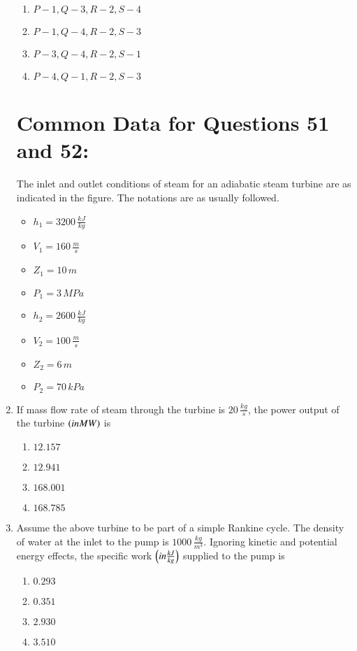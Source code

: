 \documentclass[journal,12pt,twocolumn]{IEEEtran}
\theoremstyle{remark}
\begin{document}
\begin{enumerate}[start=49]
    \begin{enumerate}
        \item $P - 1, Q - 3, R - 2, S - 4$
        \item $P - 1, Q - 4, R - 2, S - 3$
        \item $P - 3, Q - 4, R - 2, S - 1$
        \item $P - 4, Q - 1, R - 2, S - 3$
    \end{enumerate}
  

  \section{  Common Data for Questions 51 and 52:}
    
    The inlet and outlet conditions of steam for an adiabatic steam turbine are as indicated in the figure. The notations are as usually followed.
    
    \begin{itemize}
        \item $h_1 = 3200 \, \frac{kJ}{kg}$
        \item $V_1 = 160 \, \frac{m}{s}$
        \item $Z_1 = 10 \, m$
        \item $P_1 = 3 \, MPa$
        \item $h_2 = 2600 \, \frac{kJ}{kg}$
        \item $V_2 = 100 \, \frac{m}{s}$
        \item $Z_2 = 6 \, m$
        \item $P_2 = 70 \, kPa$
    \end{itemize}

    \item If mass flow rate of steam through the turbine is $20 \, \frac{kg}{s}$, the power output of the turbine $\left(in 
 MW\right)$ is
    \begin{enumerate}
        \item $12.157$
        \item $12.941$
        \item $168.001$
        \item $168.785$
    \end{enumerate}

    \item Assume the above turbine to be part of a simple Rankine cycle. The density of water at the inlet to the pump is $1000 \, \frac{kg}{m^3}$. Ignoring kinetic and potential energy effects, the specific work $\left(in \frac{kJ}{kg}\right)$ supplied to the pump is
    \begin{enumerate}
        \item $0.293$
        \item $0.351$
        \item $2.930$
        \item $3.510$
    \end{enumerate}


\end{enumerate}
\end{document}
